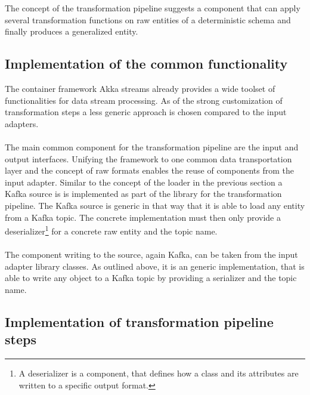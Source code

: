 The concept of the transformation pipeline suggests a component that can apply several transformation functions on raw entities of a deterministic schema and finally produces a generalized entity.

\subsection{Implementation of the common functionality}

The container framework Akka streams already provides a wide toolset of functionalities for data stream processing. As of the strong customization of transformation steps a less generic approach is chosen compared to the input adapters. 
\\\\
The main common component for the transformation pipeline are the input and output interfaces. Unifying the framework to one common data transportation layer and the concept of raw formats enables the reuse of components from the input adapter. Similar to the concept of the loader in the previous section a Kafka source is is implemented as part of the library for the transformation pipeline. The Kafka source is generic in that way that it is able to load any entity from a Kafka topic. The concrete implementation must then only provide a deserializer\footnote{A deserializer is a component, that defines how a class and its attributes are written to a specific output format.} for a concrete raw entity and the topic name.
\\\\
The component writing to the source, again Kafka, can be taken from the input adapter library classes. As outlined above, it is an generic implementation, that is able to write any object to a Kafka topic by providing a serializer and the topic name.

\subsection{Implementation of transformation pipeline steps}

